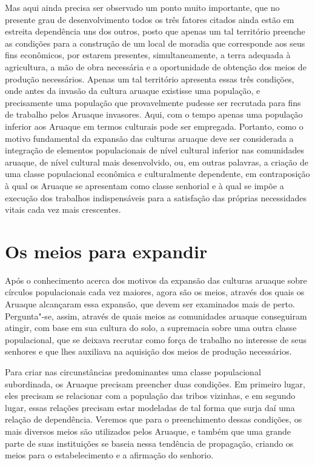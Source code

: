 Mas aqui ainda precisa ser observado um ponto muito importante, que no
presente grau de desenvolvimento todos os três fatores citados ainda
estão em estreita dependência uns dos outros, posto que apenas um tal
território preenche as condições para a construção de um local de
moradia que corresponde aos seus fins econômicos, por estarem presentes,
simultaneamente, a terra adequada à agricultura, a mão de obra
necessária e a oportunidade de obtenção dos meios de produção
necessários. Apenas um tal território apresenta essas três condições,
onde antes da invasão da cultura aruaque existisse uma população, e
precisamente uma população que provavelmente pudesse ser recrutada para
fins de trabalho pelos Aruaque invasores. Aqui, com o tempo apenas uma
população inferior aos Aruaque em termos culturais pode ser empregada.
Portanto, como o motivo fundamental da expansão das culturas aruaque
deve ser considerada a integração de elementos populacionais de nível
cultural inferior nas comunidades aruaque, de nível cultural mais
desenvolvido, ou, em outras palavras, a criação de uma classe
populacional econômica e culturalmente dependente, em contraposição à
qual os Aruaque se apresentam como classe senhorial
e à qual se impõe a execução dos trabalhos
indispensáveis para a satisfação das próprias necessidades vitais cada
vez mais crescentes.

\chapter*{Os meios para expandir\smallskip{}}

Após o conhecimento acerca dos motivos da expansão das
culturas aruaque sobre círculos populacionais cada vez maiores, agora
são os meios, através dos quais os Aruaque alcançaram essa expansão,
que devem ser examinados mais de perto. Pergunta"-se, assim, através de quais
meios as comunidades aruaque conseguiram atingir, com base em sua
cultura do solo, a supremacia sobre uma outra classe populacional,
que se deixava recrutar como força de trabalho no interesse de seus
senhores e que lhes auxiliava na aquisição dos meios de produção
necessários. 

Para criar nas circunstâncias predominantes uma classe
populacional subordinada, os Aruaque precisam preencher duas condições.
Em primeiro lugar, eles precisam se relacionar com a população das
tribos vizinhas, e em segundo lugar, essas relações precisam estar
modeladas de tal forma que surja daí uma relação de dependência.
Veremos que para o preenchimento dessas condições, os mais diversos
meios são utilizados pelos Aruaque, e também que uma grande parte de
suas instituições se baseia nessa tendência de propagação, criando os
meios para o estabelecimento e a afirmação do senhorio.

